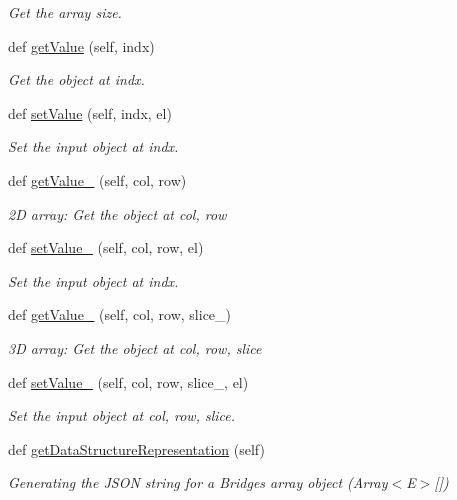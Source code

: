 \begin{DoxyCompactItemize}
\begin{DoxyCompactList}\small\item\em Get the array size. \end{DoxyCompactList}\item 
def \hyperlink{class_array_1_1_array_a6ace95175704ffe9d0c3cd0eba21f5e1}{get\+Value} (self, indx)
\begin{DoxyCompactList}\small\item\em Get the object at \textquotesingle{}indx\textquotesingle{}. \end{DoxyCompactList}\item 
def \hyperlink{class_array_1_1_array_a51ca2c608ae48eca4edd756dc0cc36ef}{set\+Value} (self, indx, el)
\begin{DoxyCompactList}\small\item\em Set the input object at \textquotesingle{}indx\textquotesingle{}. \end{DoxyCompactList}\item 
def \hyperlink{class_array_1_1_array_a54ece61c6a603ad0dd4c424da2930246}{get\+Value\+\_} (self, col, row)
\begin{DoxyCompactList}\small\item\em 2D array\+: Get the object at \textquotesingle{}col, row\textquotesingle{} \end{DoxyCompactList}\item 
def \hyperlink{class_array_1_1_array_a9a62f1add5e0af875fc950f65ae3c6c7}{set\+Value\+\_} (self, col, row, el)
\begin{DoxyCompactList}\small\item\em Set the input object at \textquotesingle{}indx\textquotesingle{}. \end{DoxyCompactList}\item 
def \hyperlink{class_array_1_1_array_ace9c0548ff188dcb220b40fc9d87152e}{get\+Value\+\_} (self, col, row, slice\+\_\+)
\begin{DoxyCompactList}\small\item\em 3D array\+: Get the object at \textquotesingle{}col, row, slice\textquotesingle{} \end{DoxyCompactList}\item 
def \hyperlink{class_array_1_1_array_a4905356edc51a707799df2df1243b0af}{set\+Value\+\_} (self, col, row, slice\+\_\+, el)
\begin{DoxyCompactList}\small\item\em Set the input object at \textquotesingle{}col, row, slice\textquotesingle{}. \end{DoxyCompactList}\item 
def \hyperlink{class_array_1_1_array_a969daf81cbb75062c5d1313f5a63688a}{get\+Data\+Structure\+Representation} (self)
\begin{DoxyCompactList}\small\item\em Generating the J\+S\+ON string for a Bridges array object (Array$<$\+E$>$\mbox{[}\mbox{]}) \end{DoxyCompactList}\end{DoxyCompactItemize}
